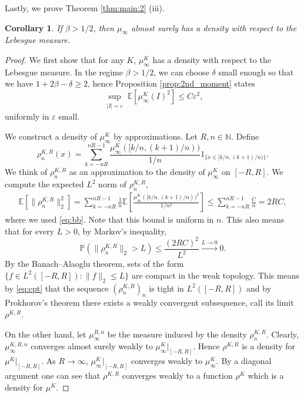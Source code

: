 \documentclass{article}
\newtheorem{cor}[thm]{Corollary}
\theoremstyle{definition}
\numberwithin{equation}{section}
\numberwithin{thm}{section}
\newcommand*{\eps}{\ensuremath{\varepsilon}}            %
\newcommand*{\NN}{\ensuremath{\mathbb{N}}}		        %
\newcommand*{\EE}{\ensuremath{\mathbb{E}}}	        	%
\newcommand*{\PP}{\ensuremath{\mathbb{P}}}	        	%
\begin{document}
Lastly, we prove Theorem \ref{thm:main:2} (iii).

\begin{cor}
    If $\beta > 1/2$, then $\mu_\infty$ almost surely has a density with respect to the Lebesgue measure.
\end{cor}

\begin{proof}
    We first show that for any $K$, $\mu_\infty^K$ has a density with respect to the Lebesgue measure.
    In the regime $\beta> 1/2$, we can choose $\delta$ small enough so that we have $1+2\beta -\delta\geq 2$, hence Proposition \ref{prop:2nd_moment} states 
    \begin{equation}\label{eq:bb}
        \sup_{\substack{\vert I \vert =\eps}} \EE\left[ \mu^K_\infty(I)^2\right] \leq C \eps^2,
    \end{equation}
    uniformly in $\eps$ small. 
    
    We construct a density of $\mu^K_\infty$ by approximations. Let $R,n\in \NN$. Define
    \begin{equation*}
        \rho_n^{K,R}(x) = \sum_{k=-nR}^{nR-1} \frac{\mu^K_\infty([k/n, (k+1)/n))}{
        1/n
        }1_{\{x \in [k/n,(k+1)/n)\}}.
    \end{equation*}
    We think of $\rho_n^{K,R}$ as an approximation to the density of $\mu_\infty^K$ on $[-R,R]$. We compute the expected $L^2$ norm of $\rho_n^{K,R}$,
    \begin{align*}
        \EE\left[\|\rho_n^{K,R}\|_2^2\right] = \sum_{k=-nR}^{nR-1} \frac{1}{n} \EE\left[\frac{\mu^K_\infty([k/n, (k+1)/n))^2}{ 1/n^2}\right] \leq \sum_{k=-nR}^{nR-1} \frac{C}{n} =2RC,
    \end{align*}
    where we used \eqref{eq:bb}. Note that this bound is uniform in $n$. This also means that for every $L>0$, by Markov's inequality, 
    \begin{equation}\label{eq:cpt}
        \PP\left(\|\rho_n^{K,R}\|_2 >L \right) \leq \frac{(2RC)^2}{L^2} \xrightarrow{L \to 0} 0.
    \end{equation}
    By the Banach--Alaoglu theorem, sets of the form $\{f\in L^2([-R,R]): \|{f}\|_2 \leq L\}$ are compact in the weak topology. This means by \eqref{eq:cpt} that the sequence $(\rho_n^{K,R})_n$ is tight in $L^2([-R,R])$
    and by Prokhorov's theorem there exists a weakly convergent subsequence, call its limit $\rho^{K,R}$.

    On the other hand, let $\mu^{R,n}_\infty$ be the measure induced by the density $\rho_n^{K,R}$. Clearly, $\mu^{K,R,n}_\infty$ converges almost surely weakly to $\mu^K_\infty \vert_{[-R,R]}$. Hence $\rho^{K,R}$ is a density for $\mu^K\vert_{[-R,R]}$. As $R\to \infty$, $\mu^K_\infty\vert_{[-R,R]}$ converges weakly to $\mu^K_\infty$. By a diagonal argument one can see that $\rho^{K,R}$ converges weakly to a function $\rho^K$ which is a density for $\mu^K$. 


\end{proof}
\end{document}
